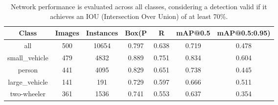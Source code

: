 \begin{table}[h!]
\centering
\begin{tabular}{|c|c|c|c|c|c|c|}
\hline
\textbf{Class} & \textbf{Images} & \textbf{Instances} & \textbf{Box(P} & \textbf{R} & \textbf{mAP@0.5} & \textbf{mAP@0.5:0.95)} \\
\hline
all            & 500             & 10654             & 0.797           & 0.638      & 0.719            & 0.478                 \\
small\_vehicle & 479             & 4832              & 0.889           & 0.751      & 0.834            & 0.604                 \\
person         & 441             & 4095              & 0.829           & 0.651      & 0.738            & 0.445                 \\
large\_vehicle & 141             & 191               & 0.729           & 0.597      & 0.666            & 0.511                 \\
two-wheeler    & 361             & 1536              & 0.741           & 0.553      & 0.637            & 0.354                 \\
\hline
\end{tabular}
\caption{Network performance is evaluated across all classes, considering a detection valid if it achieves an IOU (Intersection Over Union) of at least 70\%.}
\label{table:performance_metrics}
\end{table}




